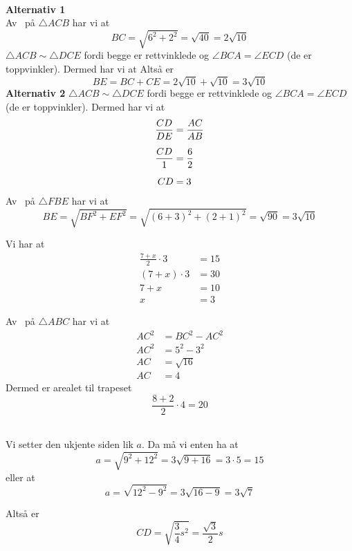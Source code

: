 





 \\
\textbf{Alternativ 1} \\
Av \pyt\ på $\triangle ACB$ har vi at
\[ BC=\sqrt{6^2+2^2}=\sqrt{40}=2\sqrt{10} \]
$\triangle ACB\sim \triangle DCE$ fordi begge er rettvinklede og $\angle BCA=\angle ECD$ (de er toppvinkler). Dermed har vi at
Altså er
\[ BE=BC+CE=2\sqrt{10}+\sqrt{10}=3\sqrt{10} \]
\textbf{Alternativ 2}
$\triangle ACB\sim \triangle DCE$ fordi begge er rettvinklede og $\angle BCA=\angle ECD$ (de er toppvinkler). Dermed har vi at
\begin{align*}
	\frac{CD}{DE}&=\frac{AC}{AB} \br
	\frac{CD}{1}&=\frac{6}{2}\br
	CD&=3
\end{align*}
Av \pyt\ på $\triangle FBE$ har vi at
\[ BE=\sqrt{BF^2+EF^2}=\sqrt{(6+3)^2+(2+1)^2}=\sqrt{90}=3\sqrt{10} \]

\newpage	
	
Vi har at
\begin{align*}
	\frac{7+x}{2}\cdot3&=15 \\
	(7+x)\cdot3&=30 \\
	7+x &= 10 \\
	x &= 3
\end{align*}

Av \pyt\ på $\triangle ABC$ har vi at
\begin{align*}
	AC^2&=BC^2-AC^2 \\
	AC^2&=5^2-3^2 \\
	AC&=\sqrt{16} \\
	AC &= 4
\end{align*}
Dermed er arealet til trapeset
\[ \frac{8+2}{2}\cdot4=20 \]
\newpage

 \\
Vi setter den ukjente siden lik $a$. Da må vi enten ha at
\[ a=\sqrt{9^2+12^2}=3\sqrt{9+16}=3\cdot5=15 \]
eller at
\[ a=\sqrt{12^2-9^2}=3\sqrt{16-9}=3\sqrt{7} \]

Altså er 
\[ CD=\sqrt{\frac{3}{4}s^2}=\frac{\sqrt{3}}{2}s \]

